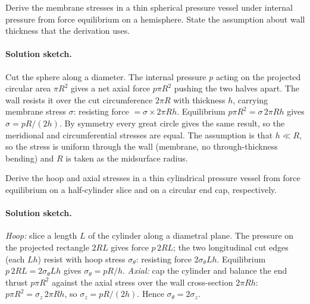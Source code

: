 \begin{exercise}
Derive the membrane stresses in a thin spherical pressure vessel
under internal pressure from force equilibrium on a hemisphere.
State the assumption about wall thickness that the derivation
uses.

\paragraph{Solution sketch.} Cut the sphere along a diameter. The
internal pressure $p$ acting on the projected circular area $\pi R^2$
gives a net axial force $p\pi R^2$ pushing the two halves apart. The
wall resists it over the cut circumference $2\pi R$ with thickness $h$,
carrying membrane stress $\sigma$: resisting force $= \sigma\times 2\pi
R h$. Equilibrium $p\pi R^2 = \sigma\,2\pi R h$ gives $\sigma = pR/(2h)$.
By symmetry every great circle gives the same result, so the
meridional and circumferential stresses are equal. The assumption is
that $h \ll R$, so the stress is uniform through the wall (membrane,
no through-thickness bending) and $R$ is taken as the midsurface
radius.
\end{exercise}

\begin{exercise}
Derive the hoop and axial stresses in a thin cylindrical pressure
vessel from force equilibrium on a half-cylinder slice and on a
circular end cap, respectively.

\paragraph{Solution sketch.} \emph{Hoop:} slice a length $L$ of the
cylinder along a diametral plane. The pressure on the projected
rectangle $2RL$ gives force $p\,2RL$; the two longitudinal cut edges
(each $Lh$) resist with hoop stress $\sigma_\theta$: resisting force
$2\sigma_\theta L h$. Equilibrium $p\,2RL = 2\sigma_\theta Lh$ gives
$\sigma_\theta = pR/h$. \emph{Axial:} cap the cylinder and balance the
end thrust $p\pi R^2$ against the axial stress over the wall
cross-section $2\pi R h$: $p\pi R^2 = \sigma_z\,2\pi R h$, so $\sigma_z
= pR/(2h)$. Hence $\sigma_\theta = 2\sigma_z$.
\end{exercise}

